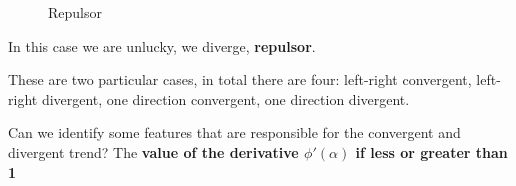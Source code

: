 \begin{figure}[!ht]
    \begin{minipage}{\linewidth}
        \centering
        \caption{Repulsor}
    \end{minipage}
\end{figure}

In this case we are unlucky, we diverge, \textbf{repulsor}.

These are two particular cases, in total there are four: left-right convergent, left-right divergent, one direction convergent, one direction divergent.

Can we identify some features that are responsible for the convergent and divergent trend? The \textbf{value of the derivative $\phi'(\alpha)$ if less or greater than 1}

\pagebreak
